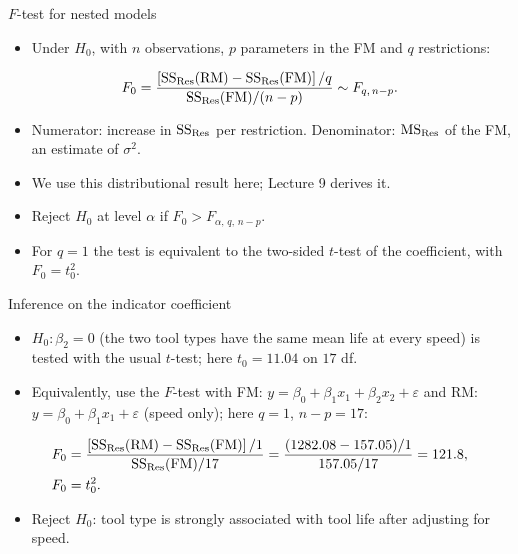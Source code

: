 \begin{frame}{$F$-test for nested models}
    \begin{itemize}
        \item Under $H_0$, with $n$ observations, $p$ parameters in the FM and $q$ restrictions:
    \end{itemize}
    \[
        F_0 = \frac{\left[\mathrm{SS}_{\mathrm{Res}}(\mathrm{RM}) - \mathrm{SS}_{\mathrm{Res}}(\mathrm{FM})\right] / q}{\mathrm{SS}_{\mathrm{Res}}(\mathrm{FM}) / (n - p)} \sim F_{q,\, n-p}.
    \]
    \begin{itemize}
        \item Numerator: increase in $\mathrm{SS}_{\mathrm{Res}}$ per restriction. Denominator: $\mathrm{MS}_{\mathrm{Res}}$ of the FM, an estimate of $\sigma^2$.
        \item We use this distributional result here; Lecture 9 derives it.
        \item Reject $H_0$ at level $\alpha$ if $F_0 > F_{\alpha,\, q,\, n-p}$.
        \item For $q = 1$ the test is equivalent to the two-sided $t$-test of the coefficient, with $F_0 = t_0^2$.
    \end{itemize}
\end{frame}


\begin{frame}{Inference on the indicator coefficient}
    \begin{itemize}
        \item $H_0\colon \beta_2 = 0$ (the two tool types have the same mean life at every speed) is tested with the usual $t$-test; here $t_0 = 11.04$ on $17$ df.
        \item Equivalently, use the $F$-test with FM: $y = \beta_0 + \beta_1 x_1 + \beta_2 x_2 + \varepsilon$ and RM: $y = \beta_0 + \beta_1 x_1 + \varepsilon$ (speed only); here $q = 1$, $n - p = 17$:
    \end{itemize}
    \begin{align*}
        F_0 &= \frac{\left[\mathrm{SS}_{\mathrm{Res}}(\mathrm{RM}) - \mathrm{SS}_{\mathrm{Res}}(\mathrm{FM})\right] / 1}{\mathrm{SS}_{\mathrm{Res}}(\mathrm{FM}) / 17}
        = \frac{(1282.08 - 157.05)/1}{157.05/17} = 121.8, \\
        F_0 &= t_0^2 .
    \end{align*}
    \begin{itemize}
        \item Reject $H_0$: tool type is strongly associated with tool life after adjusting for speed.
    \end{itemize}
\end{frame}


